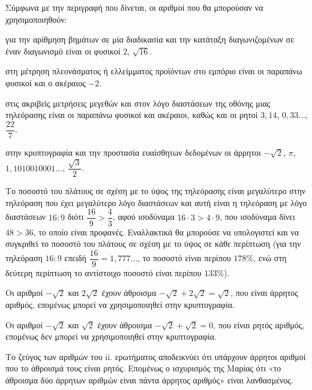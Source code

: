 
\begin{alist}
\item Σύμφωνα με την περιγραφή που δίνεται, οι αριθμοί που θα μπορούσαν να χρησιμοποιηθούν:
\begin{rlist}
\item για την αρίθμηση βημάτων σε μία διαδικασία και την κατάταξη διαγωνιζομένων σε έναν διαγωνισμό είναι οι φυσικοί $2$, $\sqrt{16}$.
\item στη μέτρηση πλεονάσματος ή ελλείμματος προϊόντων στο εμπόριο είναι οι παραπάνω φυσικοί και ο ακέραιος $-2$.
\item στις ακριβείς μετρήσεις μεγεθών και στον λόγο διαστάσεων της οθόνης μιας τηλεόρασης είναι οι παραπάνω φυσικοί και ακέραιοι, καθώς και οι ρητοί $3,14$, $0,33 \dots$, $\dfrac{22}{7}$.
\item στην κρυπτογραφία και την προστασία ευαίσθητων δεδομένων οι άρρητοι $-\sqrt{2}$, $\pi$, $1,1010010001 \dots$, $\dfrac{\sqrt{3}}{2}$.
\end{rlist}

\item Το ποσοστό του πλάτους σε σχέση με το ύψος της τηλεόρασης είναι μεγαλύτερο στην τηλεόραση που έχει μεγαλύτερο λόγο διαστάσεων και αυτή είναι η τηλεόραση με λόγο διαστάσεων $16:9$ διότι $\dfrac{16}{9} > \dfrac{4}{3}$, αφού ισοδύναμα $16 \cdot 3 > 4 \cdot 9$, που ισοδύναμα δίνει $48 > 36$, το οποίο είναι προφανές. Εναλλακτικά θα μπορούσε να υπολογιστεί και να συγκριθεί το ποσοστό του πλάτους σε σχέση με το ύψος σε κάθε περίπτωση (για την τηλεόραση $16:9$ επειδή $\dfrac{16}{9} = 1,777 \dots$, το ποσοστό είναι περίπου $178\%$, ενώ στη δεύτερη περίπτωση το αντίστοιχο ποσοστό είναι περίπου $133\%$).

\item
\begin{rlist}
\item Οι αριθμοί $-\sqrt{2}$ και $2\sqrt{2}$ έχουν άθροισμα $-\sqrt{2} + 2\sqrt{2} = \sqrt{2}$, που είναι άρρητος αριθμός, επομένως μπορεί να χρησιμοποιηθεί στην κρυπτογραφία.
\item Οι αριθμοί $-\sqrt{2}$ και $\sqrt{2}$ έχουν άθροισμα $-\sqrt{2} + \sqrt{2} = 0$, που είναι ρητός αριθμός, επομένως δεν μπορεί να χρησιμοποιηθεί στην κρυπτογραφία.
\item Το ζεύγος των αριθμών του ii. ερωτήματος αποδεικνύει ότι υπάρχουν άρρητοι αριθμοί που το άθροισμά τους είναι ρητός. Επομένως ο ισχυρισμός της Μαρίας ότι «το άθροισμα δύο άρρητων αριθμών είναι πάντα άρρητος αριθμός» είναι λανθασμένος.
\end{rlist}
\end{alist}

